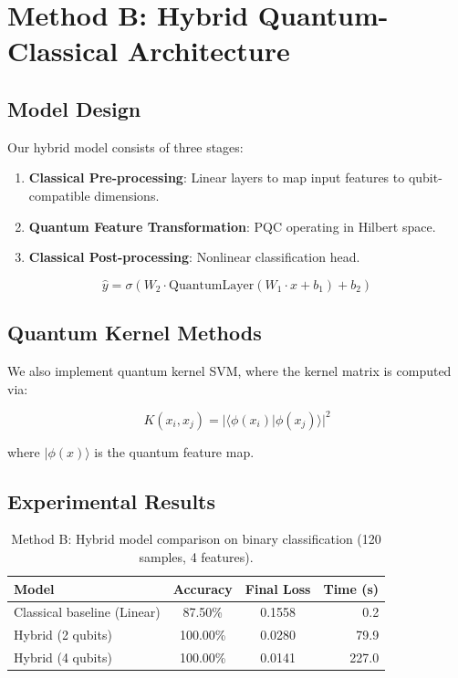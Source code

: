 \documentclass[11pt,a4paper]{article}
\begin{document}
\section{Method B: Hybrid Quantum-Classical Architecture}

\subsection{Model Design}
Our hybrid model consists of three stages:

\begin{enumerate}
    \item \textbf{Classical Pre-processing}: Linear layers to map input features to qubit-compatible dimensions.
    \item \textbf{Quantum Feature Transformation}: PQC operating in Hilbert space.
    \item \textbf{Classical Post-processing}: Nonlinear classification head.
\end{enumerate}

\begin{equation}
    \hat{y} = \sigma\left(W_2 \cdot \text{QuantumLayer}(W_1 \cdot x + b_1) + b_2\right)
\end{equation}

\subsection{Quantum Kernel Methods}
We also implement quantum kernel SVM, where the kernel matrix is computed via:

\begin{equation}
    K(x_i, x_j) = |\langle \phi(x_i) | \phi(x_j) \rangle|^2
\end{equation}

where $|\phi(x)\rangle$ is the quantum feature map.

\subsection{Experimental Results}
\begin{table}[h]
\centering
\caption{Method B: Hybrid model comparison on binary classification (120 samples, 4 features).}
\begin{tabular}{lccr}
\toprule
Model & Accuracy & Final Loss & Time (s) \\
\midrule
Classical baseline (Linear) & 87.50\% & 0.1558 & 0.2 \\
Hybrid (2 qubits) & 100.00\% & 0.0280 & 79.9 \\
Hybrid (4 qubits) & 100.00\% & 0.0141 & 227.0 \\
\bottomrule
\end{tabular}
\end{table}
\end{document}
